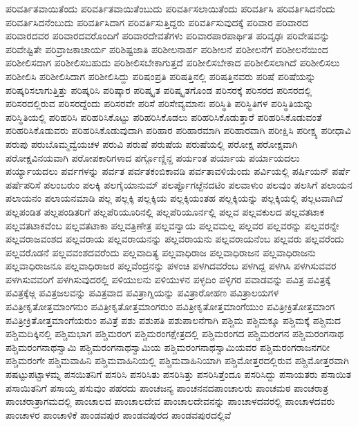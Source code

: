 {ಪರಿವರ್ತಿತವಾಯಿತೆಂದು
ಪರಿವರ್ತಿತವಾಯಿತೆಂಬುದು
ಪರಿವರ್ತಿಸಲಾಯಿತೆಂದು
ಪರಿವರ್ತಿಸಿ
ಪರಿವರ್ತಿಸಿದನೆಂದು
ಪರಿವರ್ತಿಸಿದನೆಂಬುದು
ಪರಿವರ್ತಿಸಿದಾಗ
ಪರಿವರ್ತಿಸುತ್ತಿದ್ದರು
ಪರಿವರ್ತಿಸುವುದಕ್ಕೆ
ಪರಿವಾರ
ಪರಿವಾರದ
ಪರಿವಾರದವರ
ಪರಿವಾರದವರೊಂದಿಗೆ
ಪರಿವಾರದೇವತೆಗಳು
ಪರಿವಾರಪಾರಪಾರ್ಥಿತ
ಪರಿವೃಢಃ
ಪರಿವೇಷವನ್ನು
ಪರಿವೇಷ್ಟಿತೇ
ಪರಿವ್ರಾಜಕಾಚಾರ್ಯ
ಪರಿಶಿಷ್ಟಜಾತಿ
ಪರಿಶೀಲನಾರ್ಹ
ಪರಿಶೀಲನೆ
ಪರಿಶೀಲನೆಗೆ
ಪರಿಶೀಲನೆಯಿಂದ
ಪರಿಶೀಲಿಸದಾಗ
ಪರಿಶೀಲಿಸಬಹುದು
ಪರಿಶೀಲಿಸಬೇಕಾಗುತ್ತದೆ
ಪರಿಶೀಲಿಸಬೇಕಾದ
ಪರಿಶೀಲಿಸಲಾಗಿದೆ
ಪರಿಶೀಲಿಸಲು
ಪರಿಶೀಲಿಸಿ
ಪರಿಶೀಲಿಸಿದಾಗ
ಪರಿಶೀಲಿಸಿದ್ದು
ಪರಿಷಂಪ್ರತಿ
ಪರಿಷತ್ತಿನಲ್ಲಿ
ಪರಿಷತ್ತಿನವರು
ಪರಿಷೆ
ಪರಿಷೆಯನ್ನು
ಪರಿಷ್ಕರಿಸಲಾಗುತ್ತಿತ್ತು
ಪರಿಷ್ಕರಿಸಿ
ಪರಿಷ್ಕಾರ
ಪರಿಷ್ಕೃತ
ಪರಿಷ್ಕೃತಗೊಂಡ
ಪರಿಸರಕ್ಕೆ
ಪರಿಸರದ
ಪರಿಸರದಲ್ಲಿ
ಪರಿಸರದಲ್ಲಿರುವ
ಪರಿಸರದ್ದೆಂದು
ಪರಿಸರವೇ
ಪರಿಸೆ
ಪರಿಸೇವ್ಯಮಾನಃ
ಪರಿಸ್ಥಿತಿ
ಪರಿಸ್ಥಿತಿಗಳ
ಪರಿಸ್ಥಿತಿಯನ್ನು
ಪರಿಸ್ಥಿತಿಯಲ್ಲಿ
ಪರಿಹರಿಸಿ
ಪರಿಹರಿಸಿಕೊಟ್ಟು
ಪರಿಹರಿಸಿಕೊಡಲು
ಪರಿಹರಿಸಿಕೊಡುತ್ತಾರೆ
ಪರಿಹರಿಸಿಕೊಡುವಂತೆ
ಪರಿಹರಿಸಿಕೊಡುವರು
ಪರಿಹರಿಸಿಕೊಡುವುದಾಗಿ
ಪರಿಹಾರ
ಪರಿಹಾರಮಾಗಿ
ಪರಿಹಾರವಾಗಿ
ಪರೀಕ್ಷಿಸಿ
ಪರೀಕ್ಷ್ಯ
ಪರೀಧಾವಿ
ಪರುಪು
ಪರುಬೊಮ್ಮವ್ವೆಯಚಳ
ಪರುವಿ
ಪರುಷೆ
ಪರುಷೆಯ
ಪರುಷೆಯಲ್ಲಿ
ಪರೋಕ್ಷ
ಪರೋಕ್ಷವಾಗಿ
ಪರೋಕ್ಷವಿನಯವಾಗಿ
ಪರೋಪಕಾರಿಗಳಾದ
ಪರ್ಗ್ಗೊಣ್ಣಿನ್ದ
ಪರ್ಯಂತ
ಪರ್ಯಾಯ
ಪರ್ಯಾಯದಲು
ಪರ್ಯ್ಯಾಯದಲು
ಪರ್ವಗಳನ್ನು
ಪರ್ವತ
ಪರ್ವತಕಂಬಿಕಾವಡಿ
ಪರ್ವತಾವಳಿಯೆಂದು
ಪರ್ವಿಯಲ್ಲಿ
ಪರ್ಷಿಯನ್
ಪರ್ಷೆ
ಪರ್ಷೆಪರಿಸೆ
ಪಲಂಬರುಂ
ಪಲಕ್ಕಿ
ಪಲಗೈಯಾನುಮ್
ಪಲರ್ಪ್ಪೊಗೞ್ದೆನದಟಿಂ
ಪಲವಾಳುಂ
ಪಲವುಂ
ಪಲಸಿಗೆ
ಪಲಾಯನ
ಪಲಾಯನಂ
ಪಲಾಯನಮಾಡಿ
ಪಲ್ಲ
ಪಲ್ಲಕ್ಕಿ
ಪಲ್ಲಕ್ಕಿಯ
ಪಲ್ಲಕ್ಕಿಯಂತಹ
ಪಲ್ಲಕ್ಕಿಯನ್ನು
ಪಲ್ಲಕ್ಕಿಯಲ್ಲಿ
ಪಲ್ಲಟವಾಗಿದೆ
ಪಲ್ಲಪಂಡಿತ
ಪಲ್ಲಪಂಡಿತರಿಗೆ
ಪಲ್ಲಪೆರಿಯೂರಿನಲ್ಲಿ
ಪಲ್ಲಪೆರಿಯೂರ್ನಲ್ಲಿ
ಪಲ್ಲವ
ಪಲ್ಲವಕುಲದ
ಪಲ್ಲವತಟಾಕ
ಪಲ್ಲವತಟಾಕವೆಂಬ
ಪಲ್ಲವತಟಾಕಾ
ಪಲ್ಲವತ್ರಿಣೇತ್ರ
ಪಲ್ಲವನ್ವಾಯ
ಪಲ್ಲವಮಲ್ಲ
ಪಲ್ಲವರ
ಪಲ್ಲವರನ್ನು
ಪಲ್ಲವರನ್ನೇ
ಪಲ್ಲವರಾಜವಂಶದ
ಪಲ್ಲವರಾಯ
ಪಲ್ಲವರಾಯನನ್ನು
ಪಲ್ಲವರಾಯನು
ಪಲ್ಲವರಾಯನೆಂಬ
ಪಲ್ಲವರು
ಪಲ್ಲವರೆಂದು
ಪಲ್ಲವರೊಡನೆ
ಪಲ್ಲವವಂಶದವರೆಂದು
ಪಲ್ಲವಾದಿತ್ಯ
ಪಲ್ಲವಾಧಿರಾಜ
ಪಲ್ಲವಾಧಿರಾಜನ
ಪಲ್ಲವಾಧಿರಾಜನು
ಪಲ್ಲವಾಧಿರಾಜನೂ
ಪಲ್ಲವಾಧಿರಾಜರ
ಪಲ್ಲವೆಂದ್ರನನ್ನು
ಪಳಂಚಿ
ಪಳಗಿದವರೆಂಬ
ಪಳಗಿದ್ದ
ಪಳಗಿಸಿ
ಪಳಗಿಸುವವರ
ಪಳಗಿಸುವವರಿಗೆ
ಪಳಗಿಸುವುದರಲ್ಲಿ
ಪಳಿಯುಲನು
ಪಳಿಯುಳನ
ಪಳ್ಳದಿಂ
ಪಳ್ಳಿಗರ
ಪವಾಡವನ್ನು
ಪವಿತ್ರ
ಪವಿತ್ರಕ್ಕೆ
ಪವಿತ್ರಕ್ಕೆಅ್ಗ
ಪವಿತ್ರಜಲವನ್ನು
ಪವಿತ್ರವಾದ
ಪವಿತ್ರಾಗ್ನಿಯನ್ನು
ಪವಿತ್ರಾರೋಹಣ
ಪವಿತ್ರಾಲಯಗಳ
ಪವಿತ್ರೀಕೃತೋತ್ತಮಾಂಗನುಂ
ಪವಿತ್ರೀಕೃತೋತ್ತಮಾಂಗರುಂ
ಪವಿತ್ರೀಕೃತೋತ್ತಮಾಂಗೆಯುಂ
ಪವಿತ್ರೀಕ್ರಿತೋತ್ತಮಾಂಗ
ಪವಿತ್ರೀಕ್ರಿತೋತ್ತಮಾಂಗೆಯರುಂ
ಪವಿತ್ರೆ
ಪಶು
ಪಶುಪತಿ
ಪಶುಪಾಲನೆಗಾಗಿ
ಪಶ್ಚಿಮ
ಪಶ್ಚಿಮಕ್ಕೂ
ಪಶ್ಚಿಮಕ್ಕೆ
ಪಶ್ಚಿಮದ
ಪಶ್ಚಿಮದಿಕ್ಕಿನಲ್ಲಿ
ಪಶ್ಚಿಮಭಾಗ
ಪಶ್ಚಿಮರಂಗ
ಪಶ್ಚಿಮರಂಗಕ್ಷೇತ್ರದಲ್ಲಿ
ಪಶ್ಚಿಮರಂಗದ
ಪಶ್ಚಿಮರಂಗನ
ಪಶ್ಚಿಮರಂಗನಾಥ
ಪಶ್ಚಿಮರಂಗನಾಥಸ್ವಾಮಿ
ಪಶ್ಚಿಮರಂಗನಾಥಸ್ವಾಮಿಯ
ಪಶ್ಚಿಮರಂಗನಾಥಸ್ವಾಮಿಯವರ
ಪಶ್ಚಿಮರಂಗರಾಜನಗರೀ
ಪಶ್ಚಿಮರಂಗೇ
ಪಶ್ಚಿಮವಾಹಿನಿ
ಪಶ್ಚಿಮವಾಹಿನಿಯಲ್ಲಿ
ಪಶ್ಚಿಮವಾಹಿನಿಯಾಗಿ
ಪಶ್ಚಿಮೋತ್ತರದಲ್ಲಿರುವ
ಪಶ್ಚಿಮೋತ್ತರವಾಗಿ
ಪಷಟ್ಟುಪಟ್ಟಾಳಮ್ನ
ಪಸಯಿತನಿಗೆ
ಪಸರಿಸಿ
ಪಸರಿಸಿತು
ಪಸರಿಸಿತ್ತು
ಪಸರಿಸಿತ್ತೆಂದೂ
ಪಸರಿಸಿದ್ದು
ಪಸಾಯತರು
ಪಸಾಯಿತ
ಪಸಾಯಿತನಿಗೆ
ಪಸಾಯ್ತ
ಪಸುವುಂ
ಪಹರದು
ಪಾಂಚಜನ್ಯ
ಪಾಂಚನನದಪಾಂಚಾಲರು
ಪಾಂಚಮಠ
ಪಾಂಚರಾತ್ರ
ಪಾಂಚರಾತ್ರಾಗಮದಲ್ಲಿ
ಪಾಂಚಾಲದ
ಪಾಂಚಾಲದೇವ
ಪಾಂಚಾಲದೇವನನ್ನು
ಪಾಂಚಾಳದವರಲ್ಲಿ
ಪಾಂಚಾಳದವರು
ಪಾಂಚಾಳರ
ಪಾಂಚಾಳಿಕೆ
ಪಾಂಡವಪುರ
ಪಾಂಡವಪುರದ
ಪಾಂಡವಪುರದಲ್ಲಿವೆ
}
